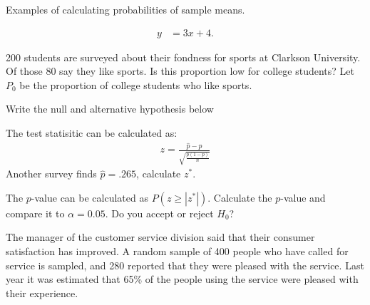 


\begin{problem}
\item Examples of calculating probabilities of sample means.

  \begin{subproblem}
  \item 
    \begin{eqnarray}
      y & = 3x + 4.
    \end{eqnarray}
    \vfill
  \end{subproblem}


\end{problem}


\begin{problem}
\item 200 students are surveyed about their fondness for sports at
  Clarkson University. Of those 80 say they like sports. Is this
  proportion low for college students? Let $P_{0}$ be the proportion
  of college students who like sports.
  \begin{subproblem}
  \item Write the null and alternative hypothesis below
    \vspace{3em}

  \item The test statisitic can be calculated as:
    \begin{eqnarray*}
      z=\frac{\hat{p}-p}{\sqrt{\frac{p(1-p)}{n}}}
    \end{eqnarray*}
    Another survey finds $\hat{p} = .265$, calculate $z^*$.

    \vfill

  \item The $p$-value can be calculated as $P(z \ge |z^*|).$ Calculate
    the $p$-value and compare it to $\alpha = 0.05$. Do you accept or
    reject $H_{0}$?

    \vfill

  \end{subproblem}

  \clearpage

  \item The manager of the customer service division said that their
    consumer satisfaction has improved. A random sample of 400 people
    who have called for service is sampled, and 280 reported that they
    were pleased with the service. Last year it was estimated that
    65\% of the people using the service were pleased with their
    experience.


\end{problem}
